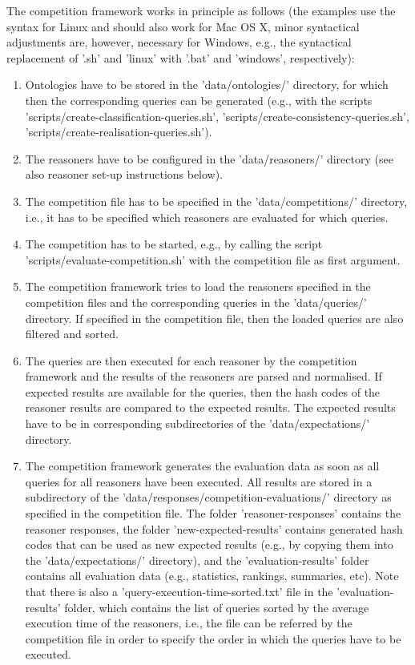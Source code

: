 \documentclass{article}
\begin{document}
The competition framework works in principle as follows (the examples use the syntax for Linux and should also work for Mac OS X, minor syntactical adjustments are, however, necessary for Windows, e.g., the syntactical replacement of '.sh' and 'linux' with '.bat' and 'windows', respectively):
\begin{enumerate}
\item Ontologies have to be stored in the 'data/ontologies/' directory, for which then the corresponding queries can be generated (e.g., with the scripts 'scripts/create-classification-queries.sh', 'scripts/create-consistency-queries.sh', 'scripts/create-realisation-queries.sh').
\item The reasoners have to be configured in the 'data/reasoners/' directory (see also reasoner set-up instructions below).
\item The competition file has to be specified in the 'data/competitions/' directory, i.e., it has to be specified which reasoners are evaluated for which queries.
\item The competition has to be started, e.g., by calling the script 'scripts/evaluate-competition.sh' with the competition file as first argument.
\item The competition framework tries to load the reasoners specified in the competition files and the corresponding queries in the 'data/queries/' directory. 
If specified in the competition file, then the loaded queries are also filtered and sorted.
\item The queries are then executed for each reasoner by the competition framework and the results of the reasoners are parsed and normalised. 
If expected results are available for the queries, then the hash codes of the reasoner results are compared to the expected results. 
The expected results have to be in corresponding subdirectories of the 'data/expectations/' directory.
\item The competition framework generates the evaluation data as soon as all queries for all reasoners have been executed.
All results are stored in a subdirectory of the 'data/responses/competition-evaluations/' directory as specified in the competition file.
The folder 'reasoner-responses' contains the reasoner responses, the folder 'new-expected-results' contains generated hash codes that can be used as new expected results (e.g., by copying them into the 'data/expectations/' directory), and the 'evaluation-results' folder contains all evaluation data (e.g., statistics, rankings, summaries, etc). 
Note that there is also a 'query-execution-time-sorted.txt' file in the 'evaluation-results' folder, which contains the list of queries sorted by the average execution time of the reasoners, i.e., the file can be referred by the competition file in order to specify the order in which the queries have to be executed.
\end{enumerate}
\end{document}
